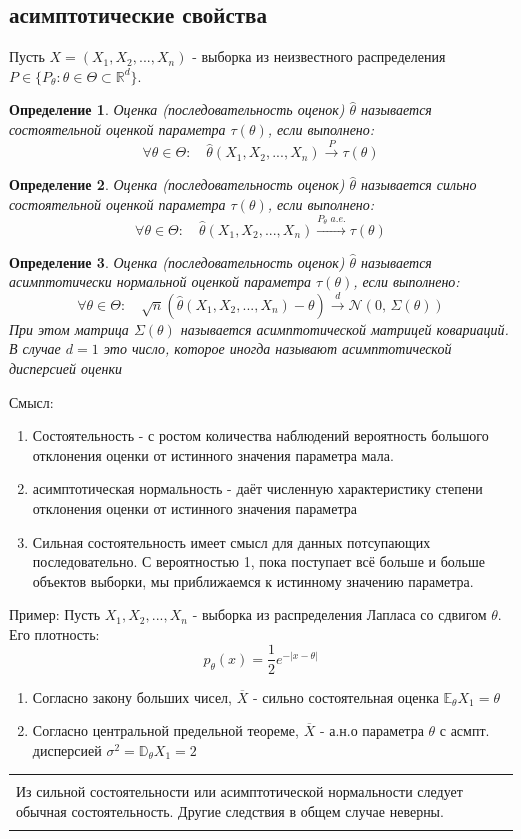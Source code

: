 \documentclass[a4paper,12pt]{article}
\newcommand{\expec}{\mathbb{E}}
\newcommand{\disp}{\mathbb{D}}
\newcommand{\normal}[2]{\mathcal{N}(#1,\,#2)}
\newcommand{\pconv}{\overset{P}{\to}}
\newcommand{\sconvt}{\overset{P_\theta \,\,a. e.}{\to}}
\newcommand{\dconv}{\overset{d}{\to}}
\newcommand{\sample}{X_1, X_2, ..., X_n}
\newcommand{\gendis}{P \in \{ P_\theta : \theta \in \Theta \subset \R^d\}}
\newcommand{\R}{\mathbb{R}}
\newenvironment{annotation}{\begin{center}
    \begin{tabular}{|p{0.9\textwidth}|}
    \hline\\
}
{ 
    \\\\\hline
    \end{tabular} 
    \end{center}
}
\newtheorem{dfn}{Определение}[section]
\theoremstyle{named}
\begin{document}
\subsection*{асимптотические свойства}
Пусть $X = (\sample)$ - выборка из неизвестного распределения $\gendis$. 
\begin{dfn}
    Оценка (последовательность оценок) $\hat\theta$ называется состоятельной оценкой параметра $\tau(\theta)$, если выполнено:
    $$
    \forall \theta \in \Theta: \quad \hat\theta(\sample) \pconv \tau(\theta)
    $$
\end{dfn}
\begin{dfn}
    Оценка (последовательность оценок) $\hat\theta$ называется сильно состоятельной оценкой параметра $\tau(\theta)$, если выполнено:
    $$
    \forall \theta \in \Theta: \quad \hat\theta(\sample) \sconvt \tau(\theta)
    $$
\end{dfn}
\begin{dfn}
    Оценка (последовательность оценок) $\hat\theta$ называется асимптотически нормальной оценкой параметра $\tau(\theta)$, если выполнено:
    $$
    \forall \theta \in \Theta: \quad \sqrt{n}(\hat\theta(\sample) - \theta) \dconv \normal{0}{\Sigma(\theta)}
    $$
    При этом матрица $\Sigma(\theta)$ называется асимптотической матрицей ковариаций. В случае $d = 1$ это число, которое иногда называют 
    асимптотической дисперсией оценки 
\end{dfn}
Смысл:
\begin{enumerate}
    \item Состоятельность - с ростом количества наблюдений вероятность большого отклонения оценки от истинного значения параметра мала.
    \item асимптотическая нормальность - даёт численную характеристику степени отклонения оценки от истинного значения параметра
    \item Сильная состоятельность имеет смысл для данных потсупающих последовательно. С вероятностью 1, пока поступает всё больше и больше 
    объектов выборки, мы приближаемся к истинному значению параметра.
\end{enumerate}
Пример: Пусть $\sample$ - выборка из распределения Лапласа со сдвигом $\theta$. Его плотность:
$$
    p_\theta(x) = \frac{1}{2}e^{-|x-\theta|}
$$
\begin{enumerate}
    \item Согласно закону больших чисел, $\overline{X}$ - сильно состоятельная оценка $\expec_\theta X_1 = \theta$
    \item Согласно центральной предельной теореме, $\overline{X}$ - а.н.о параметра $\theta$ с асмпт. дисперсией $\sigma^2 = 
    \disp_\theta X_1 = 2$ 
\end{enumerate}
\begin{annotation}
    Из сильной состоятельности или асимптотической нормальности следует обычная состоятельность. Другие следствия в общем случае неверны. 
\end{annotation}
\end{document}
